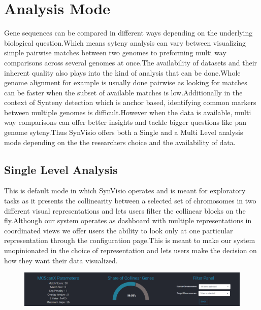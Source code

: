 \section{Analysis Mode}
Gene sequences can be compared in different ways depending on the underlying biological question.Which means syteny analysis can vary between visualizing simple pairwise matches between two genomes to preforming multi way comparisons across several genomes at once.The availability of datasets and their inherent quality also plays into the kind of analysis that can be done.Whole genome alignment for example is usually done pairwise as looking for matches can be faster when the subset of available matches is low.Additionally in the context of Synteny detection which is anchor   based, identifying common markers between multiple genomes is difficult\cite{wang2012mcscanx}.However when the data is available, multi way comparisons can offer better insights and tackle bigger questions like pan genome syteny.Thus SynVisio offers both a Single and a Multi Level analysis mode depending on the the researchers choice and the availability of data.

\subsection{Single Level Analysis}
This is default mode in which SynVisio operates and is meant for exploratory tasks as it presents the collinearity between a selected set of chromosomes in two different visual representations and lets users filter the collinear blocks on the fly.Although our system operates as dashboard with multiple representations in coordinated views we offer users the ability to  look only at one particular representation through the configuration page.This is meant to make our system unopinionated in the choice of representation and lets users make the decision on how they want their data visualized. 

\begin{figure}
  \centering
  \includegraphics[width=1\linewidth]{images/ch_5_baseparameters.PNG}
  \label{fig:ch_5_baseparameters}
\end{figure}


